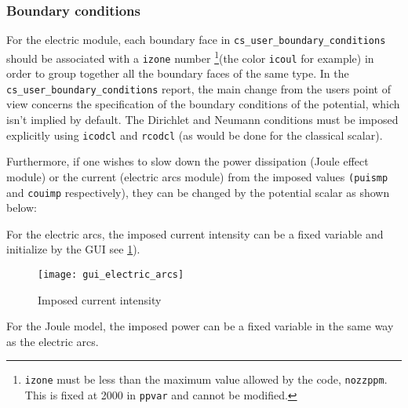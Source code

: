 \subsubsection{Boundary conditions}

For the electric module, each boundary face in \texttt{cs\_user\_boundary\_conditions} should be associated with a
 \texttt{izone} number \footnote{\texttt{izone} must be less than the maximum
 value allowed by the code, \texttt{nozzppm}. This is fixed at 2000 in \texttt
{ppvar} and cannot be modified.}(the color \texttt{icoul} for example) in
 order to group together all the boundary faces of the same type. In the
 \texttt{cs\_user\_boundary\_conditions} report, the main change from the users point of view concerns the
 specification of the boundary conditions of the potential, which isn't
 implied by default. The Dirichlet and Neumann conditions must be imposed
 explicitly using \texttt{icodcl} and \texttt{rcodcl} (as would be done for
 the classical scalar).

Furthermore, if one wishes to slow down the power dissipation (Joule
effect module) or the current (electric arcs module) from the imposed values
\texttt{(puismp} and \texttt{couimp} respectively),
 they can be changed by the potential scalar as shown below:

\begin{list}{-}{}
\item For the electric arcs, the imposed current intensity can be a fixed variable and initialize by the GUI see
\figurename\ref{fig:electric_arcs}).

\begin{figure}[ht]
\begin{center}
\texttt{[image: gui\_electric\_arcs]}
\caption{Imposed current intensity}
\label{fig:electric_arcs}
\end{center}
\end{figure}

\item For the Joule model, the imposed power  can be a fixed variable in the same way as the electric arcs.
\end{list}

